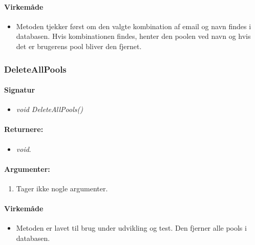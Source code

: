 \paragraph{Virkemåde}
\begin{itemize}
	\item Metoden tjekker først om den valgte kombination af email og navn findes i databasen. Hvis kombinationen findes, henter den poolen ved navn og hvis det er brugerens pool bliver den fjernet.
\end{itemize}

\subsubsection{DeleteAllPools}%




\paragraph{Signatur}
\begin{itemize}
	\item \textit{void DeleteAllPools()}
\end{itemize}

\paragraph{Returnere:}
\begin{itemize}
	\item \textit{void}.
\end{itemize}

\paragraph{Argumenter:}
\begin{enumerate}
	\item Tager ikke nogle argumenter.
\end{enumerate}

\paragraph{Virkemåde}
\begin{itemize}
	\item Metoden er lavet til brug under udvikling og test. Den fjerner alle pools i databasen.
\end{itemize}






